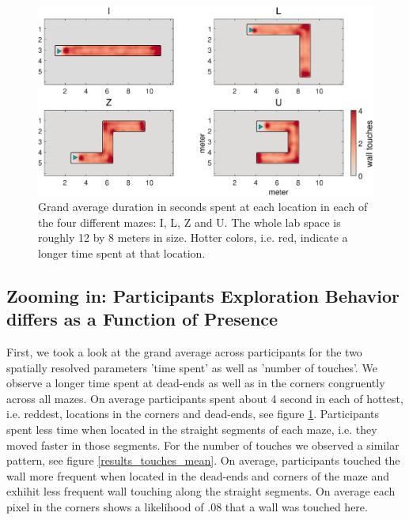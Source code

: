 \begin{figure}[ht]
\centering
\includegraphics[width=\linewidth]{figures/duration_mean.eps}
\vspace{0pt}
\caption{Grand average duration in seconds spent at each location in each of the four different mazes: I, L, Z and U. The whole lab space is roughly 12 by 8 meters in size. Hotter colors, i.e. red, indicate a longer time spent at that location.}
\label{results_dur_mean}
\end{figure}

\subsection{Zooming in: Participants Exploration Behavior differs as a Function of Presence} First, we took a look at the grand average across participants for the two spatially resolved parameters 'time spent' as well as 'number of touches'. We observe a longer time spent at dead-ends as well as in the corners congruently across all mazes. On average participants spent about 4 second in each of hottest, i.e. reddest, locations in the corners and dead-ends, see figure \ref{results_dur_mean}. Participants spent less time when located in the straight segments of each maze, i.e. they moved faster in those segments. For the number of touches we observed a similar pattern, see figure \ref{results_touches_mean}. On average, participants touched the wall more frequent when located in the dead-ends and corners of the maze and exhihit less frequent wall touching along the straight segments. On average each pixel in the corners shows a likelihood of .08 that a wall was touched here.

